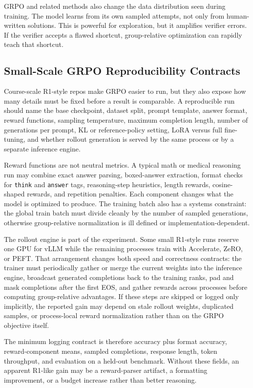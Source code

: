 GRPO and related methods also change the data distribution seen during training. The model learns from its own sampled attempts, not only from human-written solutions. This is powerful for exploration, but it amplifies verifier errors. If the verifier accepts a flawed shortcut, group-relative optimization can rapidly teach that shortcut.

\subsection{Small-Scale GRPO Reproducibility Contracts}
Course-scale R1-style repos make GRPO easier to run, but they also expose how many details must be fixed before a result is comparable. A reproducible run should name the base checkpoint, dataset split, prompt template, answer format, reward functions, sampling temperature, maximum completion length, number of generations per prompt, KL or reference-policy setting, LoRA versus full fine-tuning, and whether rollout generation is served by the same process or by a separate inference engine.

Reward functions are not neutral metrics. A typical math or medical reasoning run may combine exact answer parsing, boxed-answer extraction, format checks for \texttt{think} and \texttt{answer} tags, reasoning-step heuristics, length rewards, cosine-shaped rewards, and repetition penalties. Each component changes what the model is optimized to produce. The training batch also has a systems constraint: the global train batch must divide cleanly by the number of sampled generations, otherwise group-relative normalization is ill defined or implementation-dependent.

The rollout engine is part of the experiment. Some small R1-style runs reserve one GPU for vLLM while the remaining processes train with Accelerate, ZeRO, or PEFT. That arrangement changes both speed and correctness contracts: the trainer must periodically gather or merge the current weights into the inference engine, broadcast generated completions back to the training ranks, pad and mask completions after the first EOS, and gather rewards across processes before computing group-relative advantages. If these steps are skipped or logged only implicitly, the reported gain may depend on stale rollout weights, duplicated samples, or process-local reward normalization rather than on the GRPO objective itself.

The minimum logging contract is therefore accuracy plus format accuracy, reward-component means, sampled completions, response length, token throughput, and evaluation on a held-out benchmark. Without these fields, an apparent R1-like gain may be a reward-parser artifact, a formatting improvement, or a budget increase rather than better reasoning.


